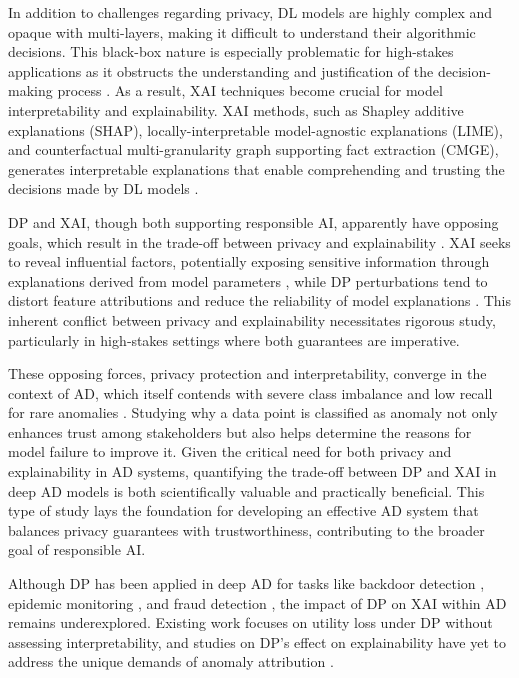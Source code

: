 In addition to challenges regarding privacy, DL models are highly complex and opaque with multi-layers, making it difficult to understand their algorithmic decisions. This black-box nature is especially problematic for high-stakes applications as it obstructs the understanding and justification of the decision-making process \citep{noor2024survey}. As a result, XAI techniques become crucial for model interpretability and explainability. XAI methods, such as Shapley additive explanations (SHAP), locally-interpretable model-agnostic explanations (LIME), and counterfactual
multi-granularity graph supporting fact extraction (CMGE), generates interpretable explanations that enable comprehending and trusting the decisions made by DL models \citep{yang2023survey}. 

DP and XAI, though both supporting responsible AI, apparently have opposing goals, which result in the trade-off between privacy and explainability \citep{ezzeddine2024differential}. XAI seeks to reveal influential factors, potentially exposing sensitive information through explanations derived from model parameters \citep{patel2022model}, while DP perturbations tend to distort feature attributions and reduce the reliability of model explanations \citep{bozorgpanah2022privacy}. This inherent conflict between privacy and explainability necessitates rigorous study, particularly in high‑stakes settings where both guarantees are imperative.

These opposing forces, privacy protection and interpretability, converge in the context of AD, which itself contends with severe class imbalance and low recall for rare anomalies \citep{pang2021deep}. Studying why a data point is classified as anomaly not only enhances trust among stakeholders but also helps determine the reasons for model failure to improve it. Given the critical need for both privacy and explainability in AD systems, quantifying the trade-off between DP and XAI in deep AD models is both scientifically valuable and practically beneficial. This type of study lays the foundation for developing an effective AD system that balances privacy guarantees with trustworthiness, contributing to the broader goal of responsible AI.

Although DP has been applied in deep AD for tasks like backdoor detection \citep{du2019robust}, epidemic monitoring \citep{fan2013differentially}, and fraud detection \citep{wang2018privacy}, the impact of DP on XAI within AD remains underexplored. Existing work focuses on utility loss under DP \citep{wu2020value,arous2023exploring} without assessing interpretability, and studies on DP’s effect on explainability have yet to address the unique demands of anomaly attribution \citep{naidu2021differential,bozorgpanah2022privacy}.

